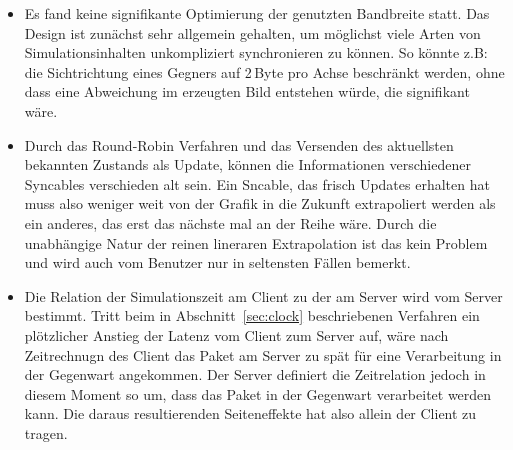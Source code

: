 \begin{itemize}
\item Es fand keine signifikante Optimierung der genutzten Bandbreite statt. Das Design ist zunächst sehr allgemein gehalten, um möglichst viele Arten von Simulationsinhalten unkompliziert synchronieren zu können. So könnte z.B: die Sichtrichtung eines Gegners auf 2\,Byte pro Achse beschränkt werden, ohne dass eine Abweichung im erzeugten Bild entstehen würde, die signifikant wäre.

\item Durch das Round-Robin Verfahren und das Versenden des aktuellsten bekannten Zustands als Update, können die Informationen verschiedener Syncables verschieden alt sein. Ein Sncable, das frisch Updates erhalten hat muss also weniger weit von der Grafik in die Zukunft extrapoliert werden als ein anderes, das erst das nächste mal an der Reihe wäre. Durch die unabhängige Natur der reinen lineraren Extrapolation ist das kein Problem und wird auch vom Benutzer nur in seltensten Fällen bemerkt.

\item Die Relation der Simulationszeit am Client zu der am Server wird vom Server bestimmt. Tritt beim in Abschnitt~\ref{sec:clock} beschriebenen Verfahren ein plötzlicher Anstieg der Latenz vom Client zum Server auf, wäre nach Zeitrechnugn des Client das Paket am Server zu spät für eine Verarbeitung in der Gegenwart angekommen. Der Server definiert die Zeitrelation jedoch in diesem Moment so um, dass das Paket in der Gegenwart verarbeitet werden kann. Die daraus resultierenden Seiteneffekte hat also allein der Client zu tragen.%
\end{itemize}



